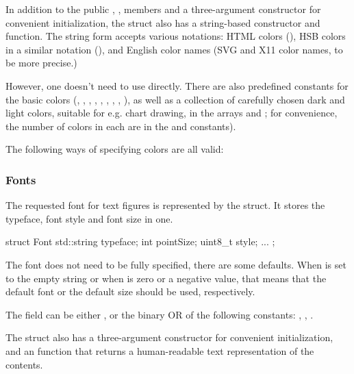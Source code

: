 In addition to the public , ,  members
and a three-argument constructor for convenient initialization, the struct
also has a string-based constructor and  function.
The string form accepts various notations: HTML colors (),
HSB colors in a similar notation (), and English color names
(SVG and X11 color names, to be more precise.)

However, one doesn't need to use  directly.
There are also predefined constants for the basic colors (,
, , , , , ,
, ), as well as a collection of carefully chosen
dark and light colors, suitable for e.g. chart drawing, in the arrays
 and ; for convenience,
the number of colors in each are in the 
and  constants).

The following ways of specifying colors are all valid:



\subsubsection{Fonts}

The requested font for text figures is represented by the 
struct. It stores the typeface, font style and font size in one.

\begin{cpp}
struct Font {
    std::string typeface;
    int pointSize;
    uint8_t style;
    ...
};
\end{cpp}

The font does not need to be fully specified, there are some defaults. When
 is set to the empty string or when  is zero
or a negative value, that means that the default font or the default size
should be used, respectively.

The  field can be either , or the binary OR of
the following constants: , ,
.

The struct also has a three-argument constructor for convenient
initialization, and an  function that returns a human-readable
text representation of the contents.

